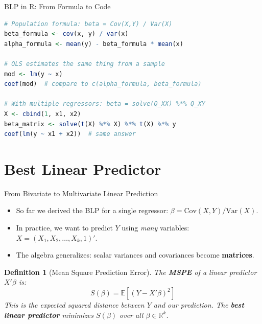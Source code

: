 \documentclass[aspectratio=169]{beamer}
\newtheorem{defn}{Definition}
\numberwithin{equation}{section}
\begin{document}
\begin{frame}[fragile]{BLP in R: From Formula to Code}
\begin{lstlisting}[language=R]
# Population formula: beta = Cov(X,Y) / Var(X)
beta_formula <- cov(x, y) / var(x)
alpha_formula <- mean(y) - beta_formula * mean(x)

# OLS estimates the same thing from a sample
mod <- lm(y ~ x)
coef(mod)  # compare to c(alpha_formula, beta_formula)

# With multiple regressors: beta = solve(Q_XX) %*% Q_XY
X <- cbind(1, x1, x2)
beta_matrix <- solve(t(X) %*% X) %*% t(X) %*% y
coef(lm(y ~ x1 + x2))  # same answer
\end{lstlisting}
\end{frame}


\section{Best Linear Predictor}

\begin{frame}{From Bivariate to Multivariate Linear Prediction}
\begin{itemize}
\item So far we derived the BLP for a single regressor: $\beta = \text{Cov}(X,Y)/\text{Var}(X)$.
\item In practice, we want to predict $Y$ using \emph{many} variables: $X = (X_1, X_2, \ldots, X_k, 1)'$.
\item The algebra generalizes: scalar variances and covariances become \textbf{matrices}.
\end{itemize}
\bigskip\pause
\begin{defn}[Mean Square Prediction Error]
The \textbf{MSPE} of a linear predictor $X'\beta$ is:
$$S(\beta) = \mathbb{E}\!\left[(Y - X'\beta)^2\right]$$
This is the expected squared distance between $Y$ and our prediction.  The \textbf{best linear predictor} minimizes $S(\beta)$ over all $\beta \in \mathbb{R}^k$.
\end{defn}
\end{frame}
\end{document}
